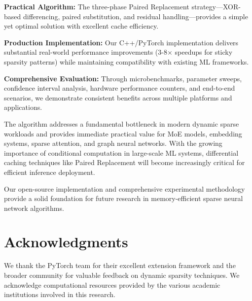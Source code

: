 \documentclass{article}
\numberwithin{equation}{section}
\theoremstyle{plain}
\theoremstyle{definition}
\theoremstyle{remark}
\begin{document}
\textbf{Practical Algorithm:} The three-phase Paired Replacement strategy—XOR-based differencing, paired substitution, and residual handling—provides a simple yet optimal solution with excellent cache efficiency.

\textbf{Production Implementation:} Our C++/PyTorch implementation delivers substantial real-world performance improvements (3-8$\times$ speedups for sticky sparsity patterns) while maintaining compatibility with existing ML frameworks.

\textbf{Comprehensive Evaluation:} Through microbenchmarks, parameter sweeps, confidence interval analysis, hardware performance counters, and end-to-end scenarios, we demonstrate consistent benefits across multiple platforms and applications.

The algorithm addresses a fundamental bottleneck in modern dynamic sparse workloads and provides immediate practical value for MoE models, embedding systems, sparse attention, and graph neural networks. With the growing importance of conditional computation in large-scale ML systems, differential caching techniques like Paired Replacement will become increasingly critical for efficient inference deployment.

Our open-source implementation and comprehensive experimental methodology provide a solid foundation for future research in memory-efficient sparse neural network algorithms.

\section*{Acknowledgments}

We thank the PyTorch team for their excellent extension framework and the broader community for valuable feedback on dynamic sparsity techniques. We acknowledge computational resources provided by the various academic institutions involved in this research.

%

\end{document}
